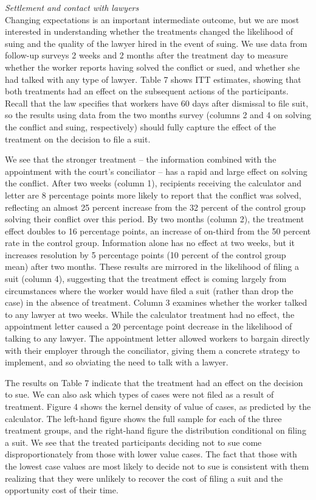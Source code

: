 \documentclass[12 pt]{article}
\begin{document}
\noindent\emph{Settlement and contact with lawyers}\\
Changing expectations is an important intermediate outcome, but we are most interested in understanding whether the treatments changed the likelihood of suing and the quality of the lawyer hired in the event of suing. We use data from follow-up surveys 2 weeks and 2 months after the treatment day to measure whether the worker reports having solved the conflict or sued, and whether she had talked with any type of lawyer. Table 7 shows ITT estimates, showing that both treatments had an effect on the subsequent actions of the participants. Recall that the law specifies that workers have 60 days after dismissal to file suit, so the results using data from the two months survey (columns 2 and 4 on solving the conflict and suing, respectively) should fully capture the effect of the treatment on the decision to file a suit.

We see that the stronger treatment – the information combined with the appointment with the court’s conciliator – has a rapid and large effect on solving the conflict. After two weeks (column 1), recipients receiving the calculator and letter are 8 percentage points more likely to report that the conflict was solved, reflecting an almost 25 percent increase from the 32 percent of the control group solving their conflict over this period. By two months (column 2), the treatment effect doubles to 16 percentage points, an increase of on-third from the 50 percent rate in the control group. Information alone has no effect at two weeks, but it increases resolution by 5 percentage points (10 percent of the control group mean) after two months. These results are mirrored in the likelihood of filing a suit (column 4), suggesting that the treatment effect is coming largely from circumstances where the worker would have filed a suit (rather than drop the case) in the absence of treatment. Column 3 examines whether the worker talked to any lawyer at two weeks. While the calculator treatment had no effect, the appointment letter caused a 20 percentage point decrease in the likelihood of talking to any lawyer. The appointment letter allowed workers to bargain directly with their employer through the conciliator, giving them a concrete strategy to implement, and so obviating the need to talk with a lawyer.

The results on Table 7 indicate that the treatment had an effect on the decision to sue. We can also ask which types of cases were not filed as a result of treatment. Figure 4 shows the kernel density of value of cases, as predicted by the calculator. The left-hand figure shows the full sample for each of the three treatment groups, and the right-hand figure the distribution conditional on filing a suit. We see that the treated participants deciding not to sue come disproportionately from those with lower value cases. The fact that those with the lowest case values are most likely to decide not to sue is consistent with them realizing that they were unlikely to recover the cost of filing a suit and the opportunity cost of their time. 
\end{document}
